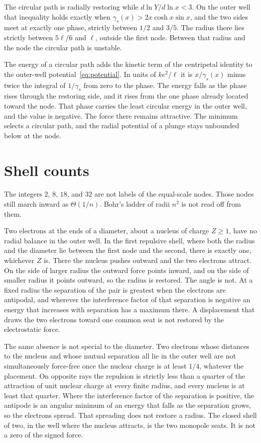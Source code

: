 \documentclass[a4paper]{article}
\begin{document}
The circular path is radially restoring while \(d\ln Y/d\ln x<3\). On the outer well that inequality holds exactly when \(\gamma_s(x)>2x\cosh x\sin x\), and the two sides meet at exactly one phase, strictly between \(1/2\) and \(3/5\). The radius there lies strictly between \(5\ell/6\) and \(\ell\), outside the first node. Between that radius and the node the circular path is unstable.

The energy of a circular path adds the kinetic term of the centripetal identity to the outer-well potential~\eqref{eq:potential}. In units of \(k e^{2}/\ell\) it is \(x/\gamma_s(x)\) minus twice the integral of \(1/\gamma_s\) from zero to the phase. The energy falls as the phase rises through the restoring side, and it rises from the one phase already located toward the node. That phase carries the least circular energy in the outer well, and the value is negative. The force there remains attractive. The minimum selects a circular path, and the radial potential of a plunge stays unbounded below at the node.

\section{Shell counts}
\label{sec:shells}

The integers \(2\), \(8\), \(18\), and \(32\) are not labels of the equal-scale nodes. Those nodes still march inward as \(\Theta(1/n)\). Bohr's ladder of radii \(n^{2}\) is not read off from them.

Two electrons at the ends of a diameter, about a nucleus of charge \(Z\ge 1\), have no radial balance in the outer well. In the first repulsive shell, where both the radius and the diameter lie between the first node and the second, there is exactly one, whichever \(Z\) is. There the nucleus pushes outward and the two electrons attract. On the side of larger radius the outward force points inward, and on the side of smaller radius it points outward, so the radius is restored. The angle is not. At a fixed radius the separation of the pair is greatest when the electrons are antipodal, and wherever the interference factor of that separation is negative an energy that increases with separation has a maximum there. A displacement that draws the two electrons toward one common seat is not restored by the electrostatic force.

The same absence is not special to the diameter. Two electrons whose distances to the nucleus and whose mutual separation all lie in the outer well are not simultaneously force-free once the nuclear charge is at least \(1/4\), whatever the placement. On opposite rays the repulsion is strictly less than a quarter of the attraction of unit nuclear charge at every finite radius, and every nucleus is at least that quarter. Where the interference factor of the separation is positive, the antipode is an angular minimum of an energy that falls as the separation grows, so the electrons spread. That spreading does not restore a radius. The closed shell of two, in the well where the nucleus attracts, is the two monopole seats. It is not a zero of the signed force.
\end{document}
